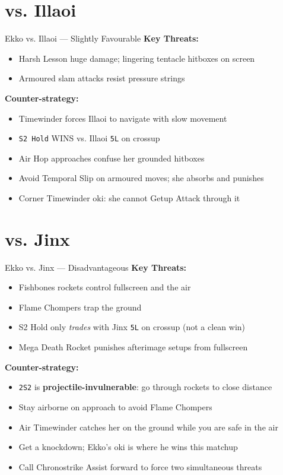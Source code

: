 \documentclass[12pt, a4paper]{report}
\newcommand{\notation}[1]{{\small\texttt{\textcolor{ekkoBlue}{#1}}}}
\newcommand{\champ}[1]{\textcolor{ekkoAccent}{\textbf{#1}}}
\begin{document}
\section{vs. \champ{Illaoi}}

\begin{matchupbox}[]{Ekko vs. Illaoi --- Slightly Favourable}
\textbf{Key Threats:}
\begin{itemize}
  \item Harsh Lesson huge damage; lingering tentacle hitboxes on screen
  \item Armoured slam attacks resist pressure strings
\end{itemize}
\textbf{Counter-strategy:}
\begin{itemize}
  \item Timewinder forces Illaoi to navigate with slow movement
  \item \notation{S2 Hold} WINS vs. Illaoi \notation{5L} on crossup
  \item Air Hop approaches confuse her grounded hitboxes
  \item Avoid Temporal Slip on armoured moves; she absorbs and punishes
  \item Corner Timewinder oki: she cannot Getup Attack through it
\end{itemize}
\end{matchupbox}

\section{vs. \champ{Jinx}}

\begin{matchupbox}[]{Ekko vs. Jinx --- Disadvantageous}
\textbf{Key Threats:}
\begin{itemize}
  \item Fishbones rockets control fullscreen and the air
  \item Flame Chompers trap the ground
  \item S2 Hold only \textit{trades} with Jinx \notation{5L} on crossup (not a clean win)
  \item Mega Death Rocket punishes afterimage setups from fullscreen
\end{itemize}
\textbf{Counter-strategy:}
\begin{itemize}
  \item \notation{2S2} is \textbf{projectile-invulnerable}: go through rockets to close distance
  \item Stay airborne on approach to avoid Flame Chompers
  \item Air Timewinder catches her on the ground while you are safe in the air
  \item Get a knockdown; Ekko's oki is where he wins this matchup
  \item Call Chronostrike Assist forward to force two simultaneous threats
\end{itemize}
\end{matchupbox}
\end{document}
